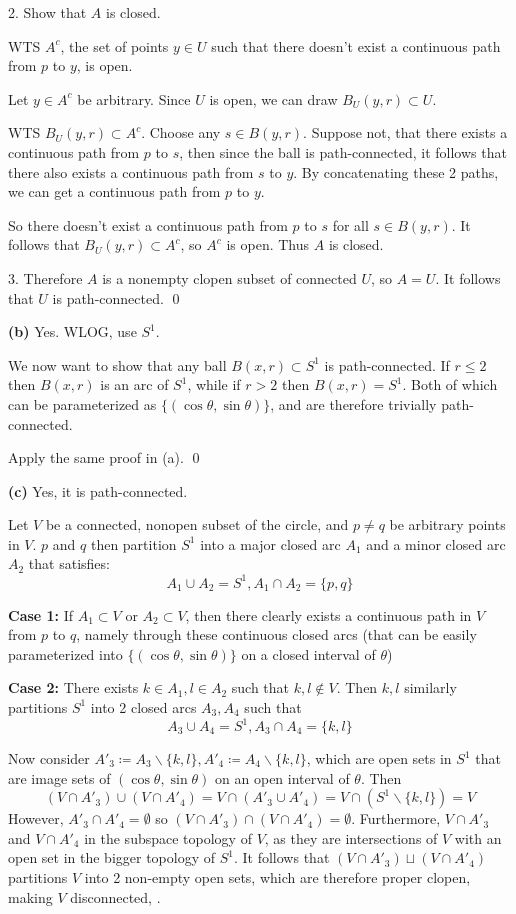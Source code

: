 \documentclass[a4paper, 12pt]{article}
\begin{document}
\begin{solution}
    2. Show that $A$ is closed.

    WTS $A^c$, the set of points $y \in U$ such that there doesn't exist a continuous path from $p$ to $y$, is open. 
    
    Let $y \in A^c$ be arbitrary. Since $U$ is open, we can draw $B_U(y, r) \subset U$.
    
    WTS $B_U(y, r) \subset A^c$. Choose any $s \in B(y, r)$. Suppose not, that there exists a continuous path from $p$ to $s$, then since the ball is path-connected, it follows that there also exists a continuous path from $s$ to $y$. By concatenating these 2 paths, we can get a continuous path from $p$ to $y$. \contra

    So there doesn't exist a continuous path from $p$ to $s$ for all $s \in B(y, r)$. It follows that $B_U(y, r) \subset A^c$, so $A^c$ is open. Thus $A$ is closed.

    3. Therefore $A$ is a nonempty clopen subset of connected $U$, so $A = U$. It follows that $U$ is path-connected. \qed

    \textbf{(b)} Yes. WLOG, use $S^1$.

    We now want to show that any ball $B(x, r) \subset S^1$ is path-connected. If $r \leq 2$ then $B(x, r)$ is an arc of $S^1$, while if $r > 2$ then $B(x, r) = S^1$. Both of which can be parameterized as $\{(\cos \theta, \sin \theta)\}$, and are therefore trivially path-connected.

    Apply the same proof in (a). \qed

    \textbf{(c)} Yes, it is path-connected.

    Let $V$ be a connected, nonopen subset of the circle, and $p \neq q$ be arbitrary points in $V$. $p$ and $q$ then partition $S^1$ into a major closed arc $A_1$ and a minor closed arc $A_2$ that satisfies: \[
        A_1 \cup A_2 = S^1, A_1 \cap A_2 = \{p, q\}
    \]

    \textbf{Case 1:} If $A_1 \subset V$ or $A_2 \subset V$, then there clearly exists a continuous path in $V$ from $p$ to $q$, namely through these continuous closed arcs (that can be easily parameterized into $\{(\cos \theta, \sin \theta)\}$ on a closed interval of $\theta$)

    \textbf{Case 2:} There exists $k \in A_1, l \in A_2$ such that $k, l \not \in V$. Then $k, l$ similarly partitions $S^1$ into 2 closed arcs $A_3, A_4$ such that \[
        A_3 \cup A_4 = S^1, A_3 \cap A_4 = \{k, l\}
    \]

    Now consider $A'_3 \coloneqq A_3 \backslash \{k, l\}, A'_4 \coloneqq A_4 \backslash \{k, l\}$, which are open sets in $S^1$ that are image sets of $(\cos \theta, \sin \theta)$ on an open interval of $\theta$. Then \[
        (V \cap A'_3) \cup (V \cap A'_4) = V \cap (A'_3 \cup A'_4) = V \cap (S^1 \backslash \{k, l\}) = V
    \]
    However, $A'_3 \cap A'_4 = \emptyset$ so $(V \cap A'_3) \cap (V \cap A'_4) = \emptyset$. Furthermore, $V \cap A'_3$ and $V \cap A'_4$ in the subspace topology of $V$, as they are intersections of $V$ with an open set in the bigger topology of $S^1$. It follows that $(V \cap A'_3) \sqcup (V \cap A'_4)$ partitions $V$ into 2 non-empty open sets, which are therefore proper clopen, making $V$ disconnected, \contra.


\end{solution}
\end{document}
